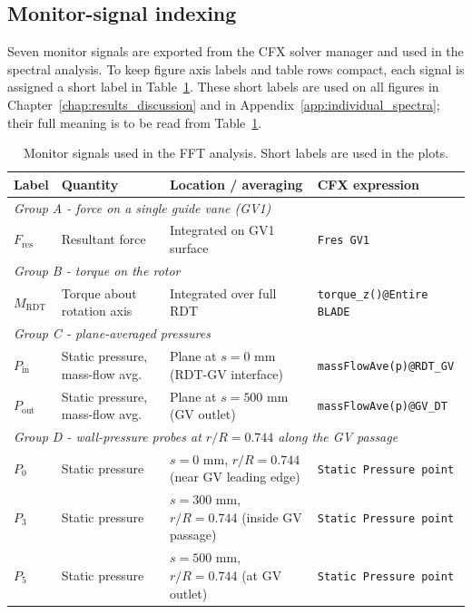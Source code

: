 \subsection{Monitor-signal indexing}
\label{sec:monitor-index}
 
Seven monitor signals are exported from the CFX solver manager and used in the spectral analysis. To keep figure axis labels and table rows compact, each signal is assigned a short label in Table~\ref{tab:monitor-index}. These short labels are used on all figures in Chapter~\ref{chap:results_discussion} and in Appendix~\ref{app:individual_spectra}; their full meaning is to be read from Table~\ref{tab:monitor-index}.
 
\begin{table}[H]
\centering
\small
\caption[FFT monitor signals]{Monitor signals used in the FFT analysis. Short labels are used in the plots.}
\label{tab:monitor-index}
\begin{tabular}{p{} p{} p{} p{}}
\hline
Label & Quantity & Location / averaging & CFX expression \\ \hline
\multicolumn{4}{l}{\textit{Group A - force on a single guide vane (GV1)}} \\
$F_{\mathrm{res}}$ & Resultant force & Integrated on GV1 surface & \texttt{Fres GV1} \\[0.4em]

\multicolumn{4}{l}{\textit{Group B - torque on the rotor}} \\
$M_{\mathrm{RDT}}$ & Torque about rotation axis & Integrated over full RDT & \texttt{torque\_z()@Entire BLADE} \\[0.4em]

\multicolumn{4}{l}{\textit{Group C - plane-averaged pressures}} \\
$P_{\mathrm{in}}$ & Static pressure, mass-flow avg. & Plane at $s = 0$ mm (RDT-GV interface) & \texttt{massFlowAve(p)@RDT\_GV} \\
$P_{\mathrm{out}}$ & Static pressure, mass-flow avg. & Plane at $s = 500$ mm (GV outlet) & \texttt{massFlowAve(p)@GV\_DT} \\[0.4em]

\multicolumn{4}{l}{\textit{Group D - wall-pressure probes at $r/R = 0.744$ along the GV passage}} \\
$P_0$ & Static pressure & $s = 0$ mm, $r/R = 0.744$ (near GV leading edge) & \texttt{Static Pressure point} \\
$P_3$ & Static pressure & $s = 300$ mm, $r/R = 0.744$ (inside GV passage) & \texttt{Static Pressure point} \\
$P_5$ & Static pressure & $s = 500$ mm, $r/R = 0.744$ (at GV outlet) & \texttt{Static Pressure point} \\ \hline
\end{tabular}
\end{table}
 
